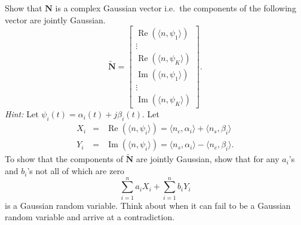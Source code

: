 \documentclass[10pt]{report}
\renewcommand\Re{\operatorname{Re}}
\renewcommand\Im{\operatorname{Im}}
\begin{document}
\begin{enumerate}
\begin{equation*}
  \end{equation*}
  Show that $\mathbf{N}$ is a complex Gaussian vector i.e.~the components of the following vector are jointly Gaussian.
  \begin{equation*}
    \tilde{\mathbf{N}} = \begin{bmatrix} \Re(\langle n, \psi_1 \rangle) \\ \vdots \\ \Re(\langle n, \psi_K \rangle) \\ \Im(\langle n, \psi_1 \rangle) \\ \vdots \\ \Im(\langle n, \psi_K \rangle) \end{bmatrix}.
  \end{equation*}
  \textit{Hint:} Let $\psi_i(t) = \alpha_i(t) + j\beta_i(t)$. Let 
  \begin{eqnarray*}
    X_i & = & \Re(\langle n, \psi_i \rangle) = \langle n_c, \alpha_i \rangle + \langle n_s, \beta_i \rangle \\
    Y_i & = & \Im(\langle n, \psi_i \rangle) = \langle n_s, \alpha_i \rangle - \langle n_c, \beta_i \rangle.
  \end{eqnarray*}
  To show that the components of $\tilde{\mathbf{N}}$ are jointly Gaussian, show that for any $a_i$'s and $b_i$'s not all of which are zero 
  \begin{equation*}
    \sum_{i=1}^n a_i X_i + \sum_{i=1}^n b_i Y_i
  \end{equation*}
  is a Gaussian random variable. Think about when it can fail to be a Gaussian random variable and arrive at a contradiction.


\end{enumerate}
\end{document}
